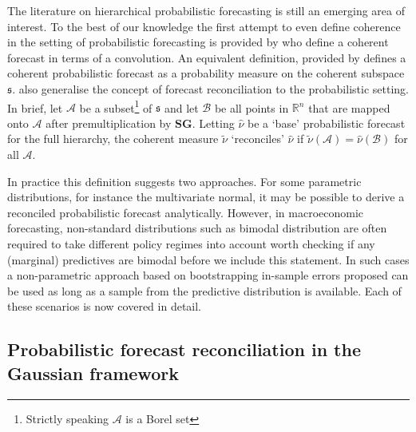 \documentclass[graybox]{svmult}
\begin{document}

The literature on hierarchical probabilistic forecasting is still an emerging area of interest. %
To the best of our knowledge the first attempt to even define coherence in the setting of probabilistic forecasting is provided by \cite{Taieb2017} who define a coherent forecast in terms of a convolution.  An equivalent definition, provided by \cite{Gamakumara2018} defines a  coherent probabilistic forecast as a probability measure on the coherent subspace $\mathfrak{s}$.  \cite{Gamakumara2018} also generalise the concept of forecast reconciliation to the probabilistic setting.  In brief, let $\mathcal{A}$ be a subset\footnote{Strictly speaking $\mathcal{A}$ is a Borel set} of $\mathfrak{s}$ and let $\mathcal{B}$ be all points in $\mathbb{R}^n$ that are mapped onto  $\mathcal{A}$ after premultiplication by $\bm{S}\bm{G}$.  Letting $\hat{\nu}$ be a `base' probabilistic forecast for the full hierarchy,
the coherent measure $\tilde{\nu}$ `reconciles' $\hat{\nu}$ if $\tilde{\nu}(\mathcal{A})=\hat{\nu}(\mathcal{B})$ for all $\mathcal{A}$.

In practice this definition suggests two approaches.  For some parametric distributions, for instance the multivariate normal, it may be possible to derive a reconciled probabilistic forecast analytically.  However, in macroeconomic forecasting, non-standard distributions such as bimodal distribution are often required to take different policy regimes into account {\color{red} worth checking if any (marginal) predictives are bimodal before we include this statement}.  In such cases a non-parametric approach based on bootstrapping in-sample errors proposed \cite{Gamakumara2018} can be used as long as a sample from the predictive distribution is available.  Each of these scenarios is now covered in detail.

\subsection{Probabilistic forecast reconciliation in the Gaussian framework}
\end{document}
